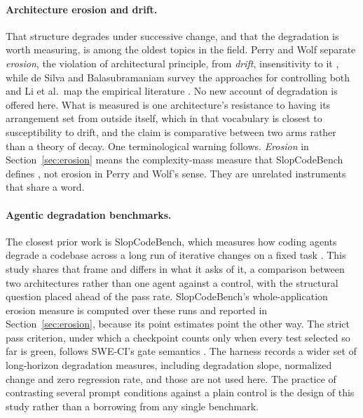 \documentclass[11pt,a4paper]{article}
\begin{document}
\paragraph{Architecture erosion and drift.} That structure degrades under
successive change, and that the degradation is worth measuring, is among the
oldest topics in the field. Perry and Wolf separate \emph{erosion}, the
violation of architectural principle, from \emph{drift}, insensitivity to it
\cite{perry1992}, while de Silva and Balasubramaniam survey the approaches for
controlling both \cite{desilva2012} and Li et al.\ map the empirical literature
\cite{li2022}. No new account of degradation is offered here. What is measured
is one architecture's resistance to having its arrangement set from outside
itself, which in that vocabulary is closest to susceptibility to drift, and the
claim is comparative between two arms rather than a theory of decay. One
terminological warning follows. \emph{Erosion} in Section~\ref{sec:erosion} means
the complexity-mass measure that SlopCodeBench defines \cite{slopcodebench}, not
erosion in Perry and Wolf's sense. They are unrelated instruments that share a
word.

\paragraph{Agentic degradation benchmarks.} The closest prior work is
SlopCodeBench, which measures how coding agents degrade a codebase across a long
run of iterative changes on a fixed task \cite{slopcodebench}. This study shares
that frame and differs in what it asks of it, a comparison between two
architectures rather than one agent against a control, with the structural
question placed ahead of the pass rate. SlopCodeBench's whole-application erosion
measure is computed over these runs and reported in Section~\ref{sec:erosion},
because its point estimates point the other way. The strict pass criterion, under
which a checkpoint counts only when every test selected so far is green, follows
SWE-CI's gate semantics \cite{sweci}. The harness records a wider set of
long-horizon degradation measures, including degradation slope, normalized change
and zero regression rate, and those are not used here. The practice of contrasting
several prompt conditions against a plain control is the design of this study
rather than a borrowing from any single benchmark.
\end{document}

